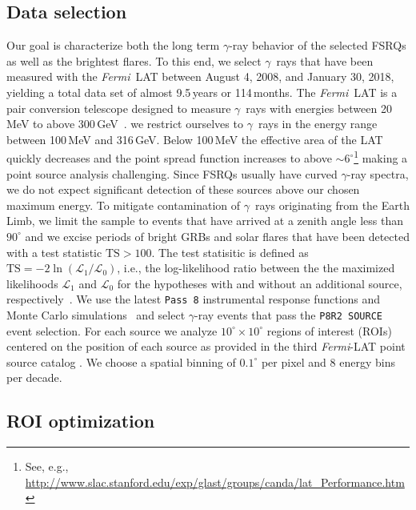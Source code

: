 \documentclass[twocolumn,linenumbers]{aastex62}
\newcommand{\Grays}{$\gamma$~rays\xspace}
\newcommand{\gray}{$\gamma$-ray\xspace}
\newcommand{\FermiLAT}{\emph{Fermi}~LAT\xspace}
\newcommand{\fermiLAT}{\emph{Fermi}-LAT\xspace}
\begin{document}
\subsection{Data selection}

Our goal is characterize both the long term \gray behavior of the selected FSRQs as well as the brightest flares.
To this end, we select \Grays that have been measured with the \FermiLAT between August 4, 2008, and January 30, 2018, yielding a total data set of almost 9.5\,years or 114\,months.
The \FermiLAT is a pair conversion telescope designed to measure \Grays with energies between 20\,MeV to above 300\,GeV~\citep{2009ApJ...697.1071A}.
 we restrict ourselves to \Grays in the energy range between 100\,MeV and 316\,GeV. 
Below 100\,MeV the effective area of the LAT quickly decreases and the point spread function increases to above $\sim 6^\circ$\footnote{See, e.g., \url{http://www.slac.stanford.edu/exp/glast/groups/canda/lat_Performance.htm}} making a point source analysis challenging. 
Since FSRQs usually have curved \gray spectra, we do not expect significant detection of these sources above our chosen maximum energy.
To mitigate contamination of \Grays originating from the Earth Limb, we limit the sample to events that have arrived at a zenith angle less than $90^\circ$ and we excise periods of bright GRBs and solar flares that have been detected with a test statistic $\mathrm{TS} > 100$.
The test statisitic is defined as $\mathrm{TS} = -2\ln(\mathcal{L}_1 / \mathcal{L}_0)$, i.e., the log-likelihood ratio between the the maximized likelihoods $\mathcal{L}_1$ and $\mathcal{L}_0$ for the hypotheses with and without an additional source, respectively~\citep{mattox1996}.
We use the latest \texttt{Pass 8} instrumental response functions and Monte Carlo simulations~\citep{pass8} and select \gray events that pass the \texttt{P8R2 SOURCE} event selection. 
For each source we analyze $10^\circ \times 10^\circ$ regions of interest (ROIs) centered on the position of each source as provided in the third \fermiLAT point source catalog \citep[3FGL,][]{3fgl}.
We choose a spatial binning of $0.1^\circ$ per pixel and 8 energy bins per decade. 

\subsection{ROI optimization}
\label{sec:roi}
\end{document}
